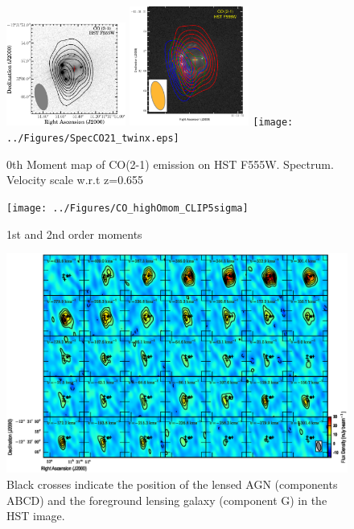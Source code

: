 \documentclass[]{emulateapj}
\begin{document}
\begin{figure}[tbph]
\centering
\includegraphics[width=0.35\textwidth]{../Figures/F555WCO21_mom0_single_invertedgray.eps}       %
\includegraphics[width=0.35\textwidth]{../Figures/F555W_REDCentBLUE.png}
\texttt{[image: ../Figures/SpecCO21\_twinx.eps]}
\caption{
0th Moment map of CO(2-1) emission on HST F555W.
Spectrum. Velocity scale w.r.t z=0.655
 \label{fig:CO21mom0}}
\end{figure}


\begin{figure}[tbph]
\centering
\texttt{[image: ../Figures/CO\_highOmom\_CLIP5sigma]}       %
\caption{
1st and 2nd order moments
 \label{fig:}}
\end{figure}




\begin{figure}[tbph]
\centering
\includegraphics[width=\textwidth]{../Figures/co_channel_maps.eps}       %
\caption{
Black crosses indicate the position of the lensed AGN (components ABCD) and the foreground lensing galaxy (component G) in the HST image.
 \label{fig:chanmap}}
\end{figure}
\end{document}

